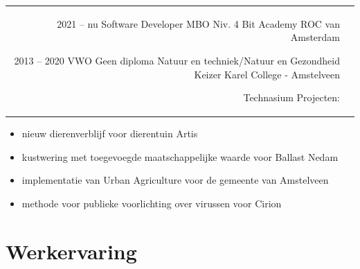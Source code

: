 \documentclass[
	11pt, %
]{FreemanCV}
\begin{document}
\begin{paracol}{2}


	\begin{supertabular}{r l} %

		\qualificationentry
		{2021 -- nu} %
		{Software Developer MBO Niv. 4} %
		{} %
		{Bit Academy} %
		{ROC van Amsterdam} %

		\qualificationentry
		{2013 -- 2020} %
		{VWO} %
		{Geen diploma} %
		{Natuur en techniek/Natuur en Gezondheid} %
		{Keizer Karel College - Amstelveen} %

		\qualificationentry
		{ } %
		{Technasium Projecten:} %
		{} %
		{ } %
		{ } %
	\end{supertabular}

		\vspace{-28pt}
		\small 
		\begin{itemize}
			\item nieuw dierenverblijf voor dierentuin Artis
			\item kustwering met toegevoegde maatschappelijke waarde voor Ballast Nedam
			\item implementatie van Urban Agriculture voor de gemeente van Amstelveen
			\item methode voor publieke voorlichting over virussen voor Cirion
		\end{itemize}
		\normalsize

	\section{Werkervaring}


\end{paracol}
\end{document}
